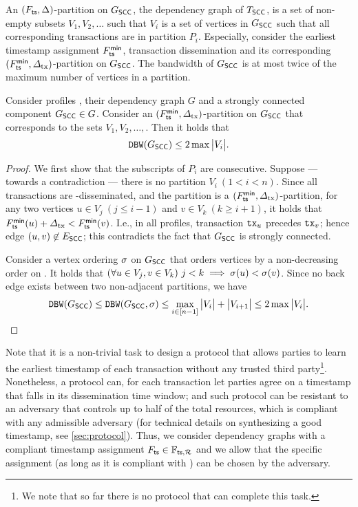 An $(F_{\mathsf{ts}}, \Delta)$-partition on $G_\mathsf{SCC}$, the dependency graph of $T_\mathsf{SCC}$, is a set of non-empty subsets $V_1, V_2, \ldots$ such that $V_i$ is a set of vertices in $G_\mathsf{SCC}$ such that all corresponding transactions are in partition $P_i$.
%
Especially, consider the earliest timestamp assignment $F^{\mathsf{min}}_{\mathsf{ts}}$, transaction dissemination \txDelay and its corresponding $(F^{\mathsf{min}}_{\mathsf{ts}}, \varDelta_{\mathrm{tx}})$-partition on $G_\mathsf{SCC}$.
%
The bandwidth of $G_\mathsf{SCC}$ is at most twice of the maximum number of vertices in a partition.

\begin{theorem} \label{thm:dbw-partition}
    Consider profiles \profileSet, their dependency graph $G$ and a strongly connected component $G_\mathsf{SCC} \in G$.
    Consider an $(F^{\mathsf{min}}_{\mathsf{ts}}, \varDelta_{\mathrm{tx}})$-partition on $G_\mathsf{SCC}$ that corresponds to the sets $V_1, V_2, \allowbreak \ldots,$. Then it holds that
    \[ \mathtt{DBW}(G_\mathsf{SCC}) \le 2 \max \big| V_i \big|. \]
\end{theorem}

\begin{proof}
    We first show that the subscripts of $P_i$ are consecutive.
    Suppose --- towards a contradiction --- there is no partition $V_i ~ (1 < i < n)$.
    Since all transactions are \txDelay-disseminated, and the partition is a $(F^{\mathsf{min}}_{\mathsf{ts}}, \varDelta_{\mathrm{tx}})$-partition, for any two vertices  $u \in V_j ~ (j \le i - 1)$ and $v \in V_k ~ (k \ge i + 1)$, it holds that $F^{\mathsf{min}}_{\mathsf{ts}}(u) + \varDelta_{\mathrm{tx}} < F^{\mathsf{min}}_{\mathsf{ts}}(v)$.
    I.e., in all profiles, transaction $\mathtt{tx}_u$ precedes $\mathtt{tx}_v$; hence edge $(u, v) \not\in E_\mathsf{SCC}$; this contradicts the fact that $G_\mathsf{SCC}$ is strongly connected.

    Consider a vertex ordering $\sigma$ on $G_\mathsf{SCC}$ that orders vertices by a non-decreasing order on \mapTimestampMin.
    It holds that $(\forall u \in V_j, v \in  V_k) ~ j < k \implies \sigma(u) < \sigma(v)$.
    Since no back edge exists between two non-adjacent partitions, we have
    \[ \mathtt{DBW}(G_\mathsf{SCC}) \le \mathtt{DBW}(G_\mathsf{SCC}, \sigma) \le  \max_{i \in [n - 1]} \big| V_i \big| + \big| V_{i + 1} \big| \le 2 \max \big| V_i \big|. \qedhere \]
\end{proof}

Note that it is a non-trivial task to design a protocol that allows parties to learn the earliest timestamp of each transaction without any trusted third party\footnote{We note that so far there is no protocol that can complete this task.}.
%
Nonetheless, a protocol can, for each transaction let parties agree on a timestamp that falls in its \txDelay dissemination time window; and such protocol can be resistant to an adversary that controls up to half of the total resources, which is compliant with any admissible adversary (for technical details on synthesizing a good timestamp, see \cref{sec:protocol}).
%
Thus, we consider dependency graphs with a compliant timestamp assignment $F_{\mathsf{ts}} \in \mathbb{F}_{\mathsf{ts}, \mathcal{R}}$ and we allow that the specific assignment (as long as it is compliant with \profileSet) can be chosen by the adversary.

